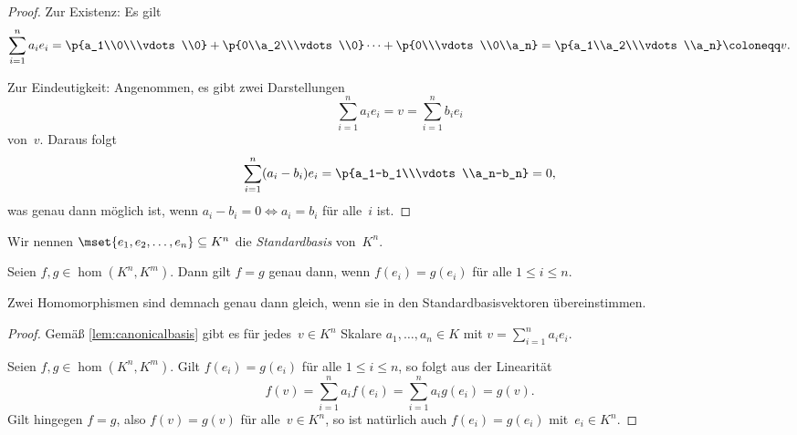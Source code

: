 \documentclass[a4paper]{article}
\begin{document}
\begin{proof}
    Zur Existenz: Es gilt
    \begin{equation*}
        \sum_{i=1}^n a_ie_i = \p{a_1\\0\\\vdots\\0} + \p{0\\a_2\\\vdots\\0}\dots + \p{0\\\vdots\\0\\a_n} = \p{a_1\\a_2\\\vdots\\a_n} \coloneqq v.
    \end{equation*}

    Zur Eindeutigkeit: Angenommen, es gibt zwei Darstellungen
    \begin{equation*}
        \sum_{i=1}^n a_ie_i = v = \sum_{i=1}^n b_ie_i
    \end{equation*}
    von~$v$. Daraus folgt
    \begin{equation*}
        \sum_{i=1}^n (a_i-b_i)e_i = \p{a_1-b_1\\\vdots\\a_n-b_n} = 0,
    \end{equation*}
    was genau dann möglich ist, wenn $a_i-b_i = 0 \iff a_i = b_i$ für alle~$i$ ist.
\end{proof}

\begin{definition}[Standardbasis]
    Wir nennen $\mset{e_1,e_2,\dots,e_n} \subseteq K^n$ die \emph{Standardbasis} von~$K^n$.
\end{definition}


\begin{lemma}\label{lem:canonincalbasis:transformation}
    Seien $f,g \in \hom(K^n,K^m)$. Dann gilt $f = g$ genau dann, wenn $f(e_i) = g(e_i)$ für alle $1 \leq i \leq n$.
\end{lemma}

Zwei Homomorphismen sind demnach genau dann gleich, wenn sie in den Standardbasisvektoren übereinstimmen.

\begin{proof}
    Gemäß \cref{lem:canonicalbasis} gibt es für jedes~$v \in K^n$ Skalare $a_1,\dots,a_n \in K$ mit $v = \sum_{i=1}^n a_ie_i$.

    Seien $f,g \in \hom(K^n,K^m)$. Gilt $f(e_i) = g(e_i)$ für alle $1 \leq i \leq n$, so folgt aus der Linearität
    \begin{equation*}
        f(v) = \sum_{i=1}^n a_if(e_i) = \sum_{i=1}^n a_ig(e_i) = g(v).
    \end{equation*}
    Gilt hingegen $f = g$, also $f(v) = g(v)$ für alle~$v \in K^n$, so ist natürlich auch $f(e_i) = g(e_i)$ mit~$e_i \in K^n$.
\end{proof}
\end{document}
